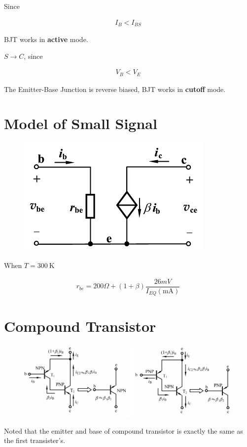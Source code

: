 Since

\begin{equation*}
  \begin{aligned}
    I_B < I_{BS}
  \end{aligned}
\end{equation*}

BJT works in \textbf{active} mode.

$S \rightarrow C$, since

\begin{equation*}
  \begin{aligned}
    V_B < V_E
  \end{aligned}
\end{equation*}

The Emitter-Base Junction is reverse biased, BJT works in \textbf{cutoff} mode.

\section{Model of Small Signal}

\begin{figure}[H]
  \centering
  \includegraphics[width=0.5\linewidth]{figures/BJT-small-signal}
\end{figure}

When $T = 300 \  \mathrm{K}$

\begin{equation*}
  \begin{aligned}
    r_{be} = 200 \si{\Omega} + \left( 1 + \beta \right) \dfrac{26 \si{mV}}{I_{EQ} \left( \mathrm{mA} \right)} 
  \end{aligned}
\end{equation*}

\section{Compound Transistor}

\begin{figure}[H]
  \centering
  \includegraphics[width=\linewidth]{figures/BJT-compound}
\end{figure}

Noted that the emitter and base of compound transistor is exactly the same as the first transister's.


